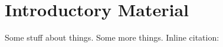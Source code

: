 \chapter{Introductory Material}
\label{chapterlabel1}

Some stuff about things.\cite{example-citation} Some more things. Inline citation: 
